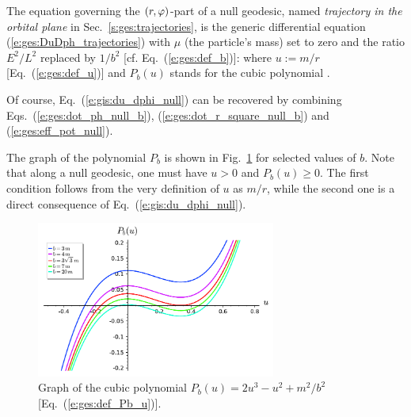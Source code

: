 The equation governing the $(r,\varphi)$-part of a null geodesic, named
\emph{trajectory in the orbital plane} in Sec.~\ref{s:ges:trajectories},
is the generic differential equation (\ref{e:ges:DuDph_trajectories})
with $\mu$ (the particle's mass) set to zero and the ratio $E^2/L^2$ replaced
by $1/b^2$ [cf. Eq.~(\ref{e:ges:def_b})]:
\be \label{e:gis:du_dphi_null}
\ee
where $u := m/r$ [Eq.~(\ref{e:ges:def_u})] and $P_b(u)$ stands for the cubic
polynomial
\be \label{e:ges:def_Pb_u}
       .
\ee
\begin{remark}
Of course, Eq.~(\ref{e:gis:du_dphi_null}) can be recovered by combining
Eqs.~(\ref{e:ges:dot_ph_null_b}), (\ref{e:ges:dot_r_square_null_b})
and (\ref{e:ges:eff_pot_null}).
\end{remark}

The graph of the polynomial $P_b$ is shown in Fig.~\ref{f:gis:polynomial_b_u}
for selected values of $b$. Note that along a null geodesic, one must
have $u>0$ and
$P_b(u) \geq 0$. The first condition follows from the very definition of
$u$ as $m/r$, while the second one is a direct consequence of
Eq.~(\ref{e:gis:du_dphi_null}).

\begin{figure}
\centerline{\includegraphics[width=0.7\textwidth]{ges_polynomial_b_u.pdf}}
\caption[]{\label{f:gis:polynomial_b_u} \footnotesize
Graph of the cubic polynomial $P_b(u) = 2 u^3 - u^2 + {m^2}/{b^2}$ [Eq.~(\ref{e:ges:def_Pb_u})].}
\end{figure}

